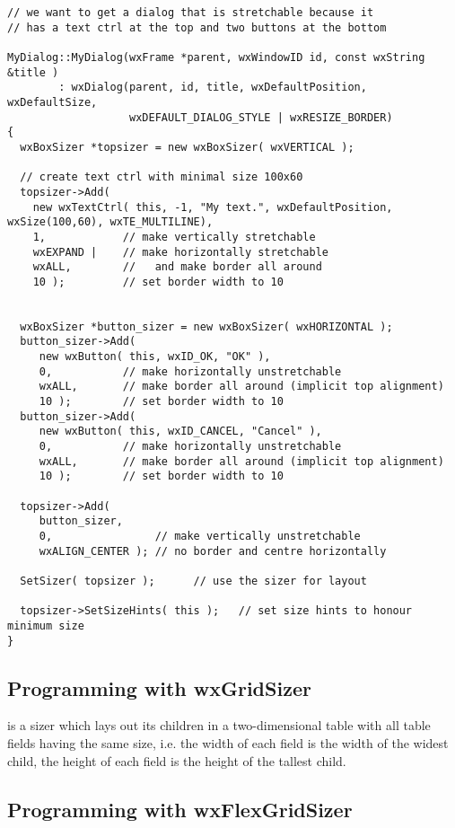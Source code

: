 \begin{verbatim}
// we want to get a dialog that is stretchable because it
// has a text ctrl at the top and two buttons at the bottom

MyDialog::MyDialog(wxFrame *parent, wxWindowID id, const wxString &title )
        : wxDialog(parent, id, title, wxDefaultPosition, wxDefaultSize,
                   wxDEFAULT_DIALOG_STYLE | wxRESIZE_BORDER)
{
  wxBoxSizer *topsizer = new wxBoxSizer( wxVERTICAL );

  // create text ctrl with minimal size 100x60
  topsizer->Add(
    new wxTextCtrl( this, -1, "My text.", wxDefaultPosition, wxSize(100,60), wxTE_MULTILINE),
    1,            // make vertically stretchable
    wxEXPAND |    // make horizontally stretchable
    wxALL,        //   and make border all around
    10 );         // set border width to 10


  wxBoxSizer *button_sizer = new wxBoxSizer( wxHORIZONTAL );
  button_sizer->Add(
     new wxButton( this, wxID_OK, "OK" ),
     0,           // make horizontally unstretchable
     wxALL,       // make border all around (implicit top alignment)
     10 );        // set border width to 10
  button_sizer->Add(
     new wxButton( this, wxID_CANCEL, "Cancel" ),
     0,           // make horizontally unstretchable
     wxALL,       // make border all around (implicit top alignment)
     10 );        // set border width to 10

  topsizer->Add(
     button_sizer,
     0,                // make vertically unstretchable
     wxALIGN_CENTER ); // no border and centre horizontally

  SetSizer( topsizer );      // use the sizer for layout

  topsizer->SetSizeHints( this );   // set size hints to honour minimum size
}
\end{verbatim}

\subsection{Programming with wxGridSizer}\label{gridsizerprogramming}

 is a sizer which lays out its children in a two-dimensional
table with all table fields having the same size,
i.e. the width of each field is the width of the widest child,
the height of each field is the height of the tallest child.

\subsection{Programming with wxFlexGridSizer}\label{flexgridsizerprogramming}


